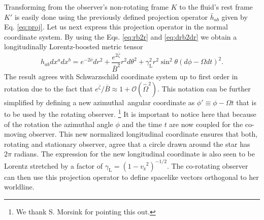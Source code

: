 \documentclass{aa}
\newcommand{\be}{\begin{equation}}
\newcommand{\ee}{\end{equation}}
\newcommand{\refe}[1]{#1}
\newcommand{\sch}{Schwarzschild }
\newcommand{\rb}{\ensuremath{\bar{r}}}
\newcommand{\Ob}{\ensuremath{\hat{\Omega}}}
\newcommand{\nub}{\ensuremath{\bar{\nu}}}
\newcommand{\zetab}{\ensuremath{\bar{\zeta}}}
\newcommand{\Bb}{\ensuremath{\bar{B}}}
\newcommand{\vz}{\ensuremath{v_{\mathrm{z}}}}
\newcommand{\lgamma}{\gamma_{\text{L}}}
\begin{document}
Transforming from the observer's non-rotating frame $K$ to the fluid's rest frame $K'$ is easily done using the previously defined projection operator $\bar{h}_{ab}$ \refe{given by Eq. \eqref{eq:proj}}.
\refe{Let us next express this projection operator in the normal coordinate system.}
By using the Eqs. \eqref{eq:rb2r} and \eqref{eq:drb2dr} we obtain a longitudinally Lorentz-boosted metric tensor 
\be \label{eq:gammaSch} 
h_{ab} dx^a dx^b = e^{-2\nub}dr^2 + \frac{e^{2\zetab}}{\Bb^2} r^2 d\theta^2 + \lgamma^2 r^2 \sin^2\theta (d\phi - \Omega dt)^2.
\ee 
The result agrees with \sch coordinate system up to first order in rotation due to the fact that $e^{\zetab}/\Bb \approx 1 + \mathcal{O}(\Ob^2)$.  
\refe{This notation can be further simplified by defining a new azimuthal angular coordinate as $\phi' \equiv \phi - \Omega t$ that is to be used by the rotating observer}.%
\footnote{We thank S. Morsink for pointing this out.}
It is important to notice here that because of the rotation the azimuthal angle $\phi$ and the time $t$ are now coupled for the co-moving observer.
\refe{This new} normalized longitudinal coordinate ensures that both, rotating and stationary observer, agree that a circle drawn around the star has $2\pi$ radians.
The expression for the new longitudinal coordinate is also seen to be Lorentz \refe{stretched} by a factor of $\lgamma = (1-\vz^2)^{-1/2}$.
\refe{The co-rotating observer can then use this projection operator to define spacelike vectors orthogonal to her worldline.}
\end{document}
